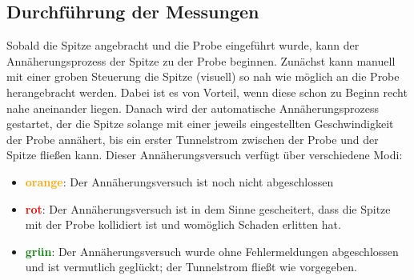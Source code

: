 \subsection{Durchführung der Messungen}
Sobald die Spitze angebracht und die Probe eingeführt wurde, 
kann der Annäherungsprozess der Spitze zu der Probe beginnen. 
Zunächst kann manuell mit einer groben Steuerung die Spitze
(visuell) so nah wie möglich an die Probe herangebracht werden.
Dabei ist es von Vorteil, wenn diese schon zu Beginn recht nahe
aneinander liegen. Danach wird der automatische Annäherungsprozess
gestartet, der die Spitze solange mit einer jeweils eingestellten
Geschwindigkeit der Probe annähert, bis ein erster Tunnelstrom
zwischen der Probe und der Spitze fließen kann.  
Dieser Annäherungsversuch verfügt über verschiedene Modi:
\begin{itemize}
    \item \textbf{\textcolor{orange}{orange}}:
            Der Annäherungsversuch ist noch
            nicht abgeschlossen
    \item \textbf{\textcolor{red}{rot}}: 
            Der Annäherungsversuch ist in dem Sinne
            gescheitert, dass die Spitze mit der Probe kollidiert
            ist und womöglich Schaden erlitten hat. 
    \item \textbf{\textcolor{green}{grün}}: 
            Der Annäherungsversuch
            wurde ohne Fehlermeldungen
            abgeschlossen und ist vermutlich geglückt;
            der Tunnelstrom fließt wie vorgegeben.
\end{itemize}
